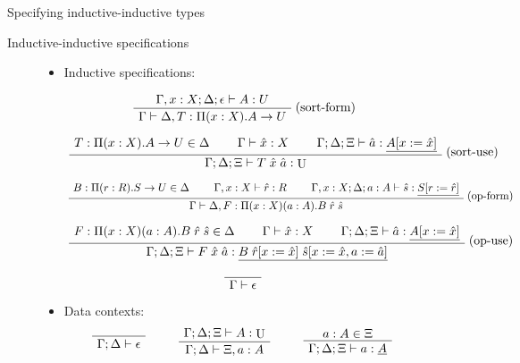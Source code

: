 \documentclass[runningheads]{llncs}
\newenvironment{bprooftree}
  {\leavevmode\hbox\bgroup}
  {\DisplayProof\egroup}
\DeclareMathOperator{\UU}{U}
\newcommand{\tac}{\vdash}
\begin{document}
{\begin{section}{Specifying inductive-inductive types}
\begin{subsection}{Inductive-inductive specifications}
\begin{figure}[htpb]
    \begin{itemize}
        \item Inductive specifications: \hfill \boxed{\Gamma \tac \Delta}
        
        \[\begin{bprooftree}
            \AxiomC{$\Gamma , x : X ; \Delta ; \epsilon \tac A : U$}\UnaryInfC{$\Gamma \tac \Delta , T : \Pi(x:X).A\to U$}
        \end{bprooftree}\text{(sort-form)}\]
        
        \[\begin{bprooftree}
            \AxiomC{$T : \Pi(x : X).A \to U \in \Delta$}\AxiomC{$\Gamma \tac \hat{x} : X$}\AxiomC{$\Gamma ; \Delta ; \Xi \tac \hat{a} : \underline{A[x:=\hat{x}]}$}\TrinaryInfC{$\Gamma ; \Delta ; \Xi \tac T\;\hat{x}\;\hat{a} : \UU$}
        \end{bprooftree}\text{(sort-use)}\]
        
        \[\begin{bprooftree}
            \AxiomC{$B : \Pi(r : R).S\to U  \in \Delta$}\AxiomC{$\Gamma , x : X \tac \hat{r} : R$}\AxiomC{$\Gamma , x : X ; \Delta ; a : A \tac \hat{s} : \underline{S[r:=\hat{r}]}$}\TrinaryInfC{$\Gamma \tac \Delta , F : \Pi(x : X)(a : A).B\;\hat{r}\;\hat{s}$}
        \end{bprooftree}\text{(op-form)}\]
        
        \[\begin{bprooftree}
            \AxiomC{$F : \Pi(x : X)(a : A).B\;\hat{r}\;\hat{s} \in \Delta$}\AxiomC{$\Gamma \tac \hat{x} : X$}\AxiomC{$\Gamma ; \Delta ; \Xi \tac \hat{a} : \underline{A[x:=\hat{x}]}$}\TrinaryInfC{$\Gamma ; \Delta ; \Xi \tac F\;\hat{x}\;\hat{a} : \underline{B\;\hat{r}[x := \hat{x}]\;\hat{s}[x := \hat{x}, a := \hat{a}]}$}
        \end{bprooftree}\text{(op-use)}\]
        
        \[\begin{bprooftree}
                \AxiomC{}\UnaryInfC{$\Gamma\tac \epsilon$}
        \end{bprooftree}\]

        \item Data contexts: \hfill \boxed{\Gamma ; \Delta \tac \Xi}
        \[
            \begin{bprooftree}
                \AxiomC{}\UnaryInfC{$\Gamma ; \Delta \tac \epsilon$}
            \end{bprooftree}
            \qquad
            \begin{bprooftree}
                \AxiomC{$\Gamma ; \Delta ; \Xi \tac A : \UU$}\UnaryInfC{$\Gamma ; \Delta \tac \Xi , a : A$}
            \end{bprooftree}
            \qquad
            \begin{bprooftree}
                \AxiomC{$a : A \in \Xi$}\UnaryInfC{$\Gamma ; \Delta ; \Xi \tac a : \underline{A}$}
            \end{bprooftree}
        \]


\end{itemize}
\end{figure}
\end{subsection}
\end{section}}
\end{document}
